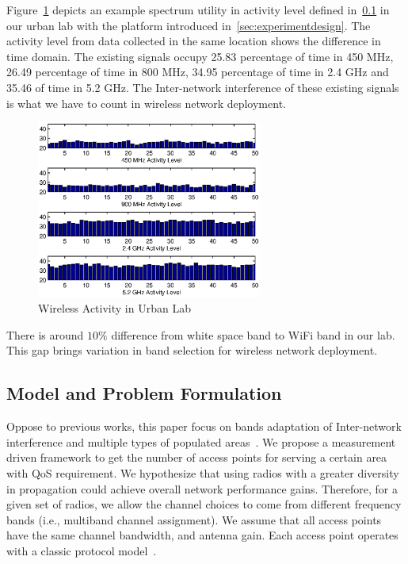 Figure~\ref{fig:labact} depicts an example spectrum utility in activity level
defined in~\ref{subsec:problem} in our urban lab with the platform introduced 
in~\ref{sec:experimentdesign}. 
The activity level from data collected in the same location shows 
the difference in time domain. The existing signals occupy 25.83 
percentage of time in 450 MHz, 26.49 percentage of time in 800 MHz, 
34.95 percentage of time in 2.4 GHz and 35.46 of time in 5.2 GHz. 
The Inter-network interference of these existing signals is what 
we have to count in wireless network deployment. 
   \begin{figure}
   \centering
   \includegraphics[width=74mm]{figures/labactivity}
   \vspace{-0.1in}
   \caption{Wireless Activity in Urban Lab}                                                                 
   \label{fig:labact}
   \end{figure}
There is around $10\%$ difference from white space band to WiFi band in 
our lab. This gap brings variation in band selection for wireless network deployment.

\subsection{Model and Problem Formulation}
\label{subsec:problem}

Oppose to previous works, this paper focus on bands adaptation of Inter-network 
interference and multiple types of populated areas~\cite{tang2005interference,yuan2006cross
,si2010overview}. We propose a measurement driven framework to get the  
number of access points for serving a certain area with QoS requirement.
We hypothesize that using radios with a greater diversity in propagation could 
achieve overall network performance gains. Therefore, for a given set of radios,
we allow the channel choices to come from different frequency bands 
(i.e., multiband channel assignment). We assume that all access points have the same 
channel bandwidth, and antenna gain.
Each access point operates with a classic protocol model~\cite{gupta2000capacity}. 

